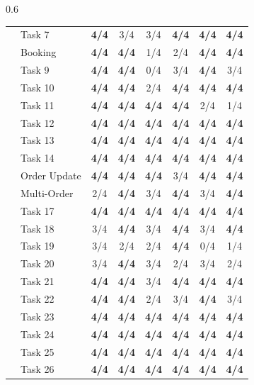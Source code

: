 \begin{table}[t]
\begin{subtable}[t]{0.6\textwidth}
\begin{tabular}{@{}llcccccc@{}}
 & Task 7 & \textbf{4/4} & 3/4 & 3/4 & \textbf{4/4} & \textbf{4/4} & \textbf{4/4} \\
 & Booking & \textbf{4/4} & \textbf{4/4} & 1/4 & 2/4 & \textbf{4/4} & \textbf{4/4} \\
 & Task 9 & \textbf{4/4} & \textbf{4/4} & 0/4 & 3/4 & \textbf{4/4} & 3/4 \\
 & Task 10 & \textbf{4/4} & \textbf{4/4} & 2/4 & \textbf{4/4} & \textbf{4/4} & \textbf{4/4} \\
 & Task 11 & \textbf{4/4} & \textbf{4/4} & \textbf{4/4} & \textbf{4/4} & 2/4 & 1/4 \\
 & Task 12 & \textbf{4/4} & \textbf{4/4} & \textbf{4/4} & \textbf{4/4} & \textbf{4/4} & \textbf{4/4} \\
 & Task 13 & \textbf{4/4} & \textbf{4/4} & \textbf{4/4} & \textbf{4/4} & \textbf{4/4} & \textbf{4/4} \\
 & Task 14 & \textbf{4/4} & \textbf{4/4} & \textbf{4/4} & \textbf{4/4} & \textbf{4/4} & \textbf{4/4} \\
 & Order Update & \textbf{4/4} & \textbf{4/4} & \textbf{4/4} & 3/4 & \textbf{4/4} & \textbf{4/4} \\
 & Multi-Order & 2/4 & \textbf{4/4} & 3/4 & \textbf{4/4} & 3/4 & \textbf{4/4} \\
 & Task 17 & \textbf{4/4} & \textbf{4/4} & \textbf{4/4} & \textbf{4/4} & \textbf{4/4} & \textbf{4/4} \\
 & Task 18 & 3/4 & \textbf{4/4} & 3/4 & \textbf{4/4} & 3/4 & \textbf{4/4} \\
 & Task 19 & 3/4 & 2/4 & 2/4 & \textbf{4/4} & 0/4 & 1/4 \\
 & Task 20 & 3/4 & \textbf{4/4} & 3/4 & 2/4 & 3/4 & 2/4 \\
 & Task 21 & \textbf{4/4} & \textbf{4/4} & 3/4 & \textbf{4/4} & \textbf{4/4} & \textbf{4/4} \\
 & Task 22 & \textbf{4/4} & \textbf{4/4} & 2/4 & 3/4 & \textbf{4/4} & 3/4 \\
 & Task 23 & \textbf{4/4} & \textbf{4/4} & \textbf{4/4} & \textbf{4/4} & \textbf{4/4} & \textbf{4/4} \\
 & Task 24 & \textbf{4/4} & \textbf{4/4} & \textbf{4/4} & \textbf{4/4} & \textbf{4/4} & \textbf{4/4} \\
 & Task 25 & \textbf{4/4} & \textbf{4/4} & \textbf{4/4} & \textbf{4/4} & \textbf{4/4} & \textbf{4/4} \\
 & Task 26 & \textbf{4/4} & \textbf{4/4} & \textbf{4/4} & \textbf{4/4} & \textbf{4/4} & \textbf{4/4} \\

\end{tabular}
\end{subtable}
\end{table}
